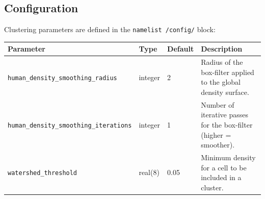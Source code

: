 \subsection{Configuration}
Clustering parameters are defined in the \texttt{namelist /config/} block:

\begin{center}
\begin{tabular}{|l|l|l|p{6cm}|}
\hline
\textbf{Parameter} & \textbf{Type} & \textbf{Default} & \textbf{Description} \\
\hline
\texttt{human\_density\_smoothing\_radius} & integer & 2 & Radius of the box-filter applied to the global density surface. \\
\hline
\texttt{human\_density\_smoothing\_iterations} & integer & 1 & Number of iterative passes for the box-filter (higher = smoother). \\
\hline
\texttt{watershed\_threshold} & real(8) & 0.05 & Minimum density for a cell to be included in a cluster. \\
\hline
\end{tabular}
\end{center}

